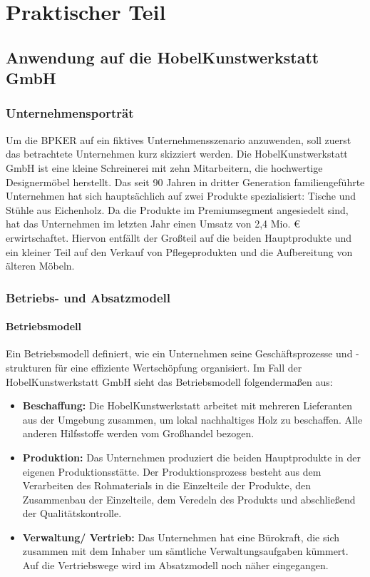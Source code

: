 \chapter{Praktischer Teil}


\section{Anwendung auf die HobelKunstwerkstatt GmbH}

\subsection{Unternehmensporträt}

Um die BPKER auf ein fiktives Unternehmensszenario anzuwenden, soll zuerst das betrachtete Unternehmen kurz skizziert werden. Die HobelKunstwerkstatt GmbH ist eine kleine Schreinerei mit zehn Mitarbeitern, die hochwertige Designermöbel herstellt. Das seit 90 Jahren in dritter Generation familiengeführte Unternehmen hat sich hauptsächlich auf zwei Produkte spezialisiert: Tische und Stühle aus Eichenholz. Da die Produkte im Premiumsegment angesiedelt sind, hat das Unternehmen im letzten Jahr einen Umsatz von 2,4 Mio. {\euro} erwirtschaftet. Hiervon entfällt der Gro{\ss}teil auf die beiden Hauptprodukte und ein kleiner Teil auf den Verkauf von Pflegeprodukten und die Aufbereitung von älteren Möbeln.

\subsection{Betriebs- und Absatzmodell}

\subsubsection{Betriebsmodell}

Ein Betriebsmodell definiert, wie ein Unternehmen seine Geschäftsprozesse und -strukturen für eine effiziente Wertschöpfung organisiert. Im Fall der HobelKunstwerkstatt GmbH sieht das Betriebsmodell folgenderma{\ss}en aus:

\begin{itemize}
    \item \textbf{Beschaffung:} Die HobelKunstwerkstatt arbeitet mit mehreren Lieferanten aus der Umgebung zusammen, um lokal nachhaltiges Holz zu beschaffen. Alle anderen Hilfsstoffe werden vom Gro{\ss}handel bezogen. 
    \item \textbf{Produktion:} Das Unternehmen produziert die beiden Hauptprodukte in der eigenen Produktionsstätte. Der Produktionsprozess besteht aus dem Verarbeiten des Rohmaterials in die Einzelteile der Produkte, den Zusammenbau der Einzelteile, dem Veredeln des Produkts und abschlie{\ss}end der Qualitätskontrolle.
    \item \textbf{Verwaltung/ Vertrieb:} Das Unternehmen hat eine Bürokraft, die sich zusammen mit dem Inhaber um sämtliche Verwaltungsaufgaben kümmert. Auf die Vertriebswege wird im Absatzmodell noch näher eingegangen.
\end{itemize}

